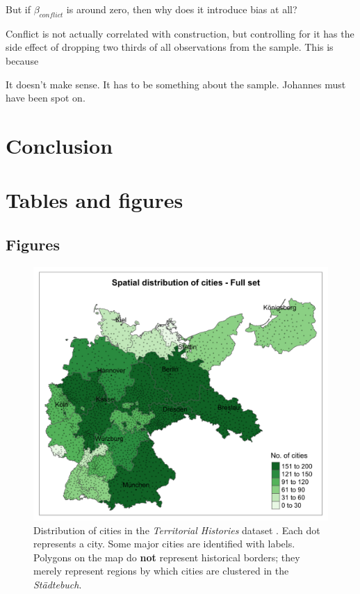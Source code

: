 \documentclass[11pt, a4paper]{article}
\begin{document}
But if $\beta_{conflict}$ is around zero, then why does it introduce bias at all?

Conflict is not actually correlated with construction, but controlling for it has the side effect of dropping two thirds of all observations from the sample. This is because 





It doesn't make sense. It has to be something about the sample. Johannes must have been spot on.




\section{Conclusion} \label{sec:conclusion}

\newpage
\onehalfspacing



\newpage
\section*{Tables and figures}



\subsection*{Figures}

\begin{figure}[ht]
    \centering
    \includegraphics[scale=0.15]{paper/output/descriptive/map_cities_raw.png}
    \caption{Distribution of cities in the \textit{Territorial Histories} dataset \citep{pt2}. Each dot represents a city. Some major cities are identified with labels. Polygons on the map do \textbf{not} represent historical borders; they merely represent regions by which cities are clustered in the \textit{Städtebuch}.}
    \label{fig:map_cities_raw}
\end{figure}
\end{document}
